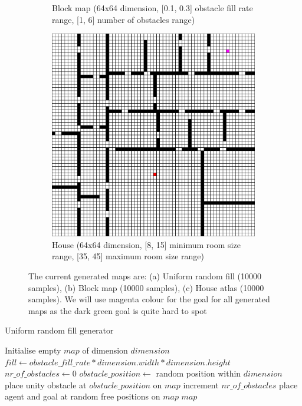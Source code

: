 \begin{figure}[h!]
\begin{subfigure}[b]{0.3\linewidth}
     \caption{Block map (64x64 dimension, [0.1, 0.3] obstacle fill rate range, [1, 6] number of obstacles range)}
  \end{subfigure}
  \hfill
  \begin{subfigure}[b]{0.3\linewidth}
    \includegraphics[width=\linewidth]{images/screenshot_53.png}
     \caption{House (64x64 dimension, [8, 15] minimum room size range, [35, 45] maximum room size range)}
  \end{subfigure}
  \caption{The current generated maps are: (a) Uniform random fill (10000 samples), (b) Block map (10000 samples), (c) House atlas (10000 samples). We will use magenta colour for the goal for all generated maps as the dark green goal is quite hard to spot}
  \label{fig: generated maps}
\end{figure}

\begin{algorithm}[!htb]
\caption{Uniform random fill generator}
\label{alg: Uniform random fill generator}
\begin{algorithmic}[1]
    \State Initialise empty $map$ of dimension $dimension$
    \State $fill \gets obstacle\_fill\_rate * dimension.width * dimension.height$
    \State $nr\_of\_obstacles \gets 0$
    \State
        \State $obstacle\_position \gets$ random position within $dimension$
            \State place unity obstacle at $obstacle\_position$ on $map$
            \State increment $nr\_of\_obstacles$ 
        \EndIf
    \EndWhile
    \State
    \State place agent and goal at random free positions on $map$
    \State \Return $map$
\EndProcedure
\end{algorithmic}
\end{algorithm}

